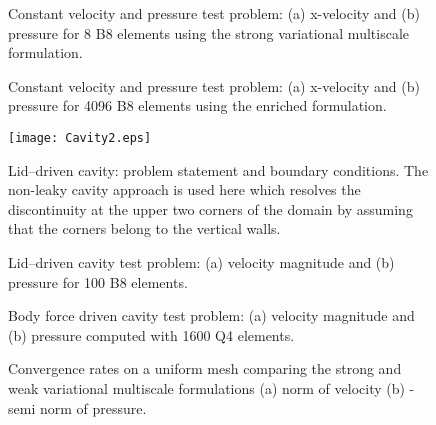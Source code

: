 \documentclass[11pt]{amsart}
\begin{document}
\begin{figure}[htb!]
	\centering
{}
	\caption{Constant velocity and pressure test problem: (a) x-velocity and (b) pressure for 8 B8 elements using the strong variational multiscale formulation.}
	\label{fig:StabilizedCoarse2}
\end{figure}
\begin{figure}[htb!]
	\centering
{}
	\caption{Constant velocity and pressure test problem: (a) x-velocity and (b) pressure for 4096 B8 elements using the enriched formulation.}
	\label{fig:ConstantFlowRefined}
\end{figure}
\begin{figure}[htb!]
	\centering
  \texttt{[image: Cavity2.eps]}
	\caption{Lid--driven cavity: problem statement and boundary conditions.  The non-leaky cavity approach is used here which resolves the discontinuity at the upper two corners of the domain by assuming that the corners belong to the vertical walls.}
	\label{fig:Cavity}
\end{figure}
\begin{figure}[htb!]
	\begin{center}
  \end{center}
	\caption{Lid--driven cavity test problem: (a) velocity magnitude and (b) pressure for 100 B8 elements.}
	\label{fig:CavityVelPress}
\end{figure}
\begin{figure}[htb!]
	\begin{center}
  \end{center}
	\caption{Body force driven cavity test problem: (a) velocity magnitude and (b) pressure computed with 1600 Q4 elements.}
	\label{fig:BodyForce}
\end{figure}
\begin{figure}[htb!]
	\centering
	\caption{Convergence rates on a uniform mesh comparing the strong and weak variational multiscale formulations (a)  norm of velocity (b) -semi norm of pressure.}
	\label{fig:Convergence}
\end{figure} 
\end{document}
